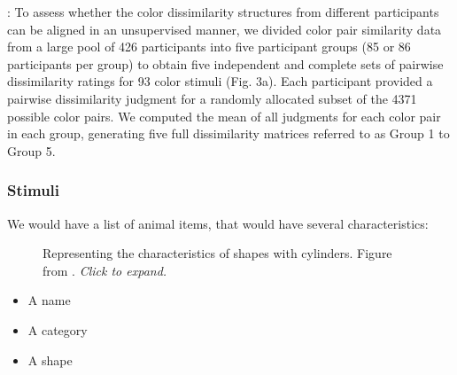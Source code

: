 \documentclass[
  authoryear]{elsarticle}
\begin{document}
\citet{kawakita2023}: To assess whether the color dissimilarity
structures from different participants can be aligned in an unsupervised
manner, we divided color pair similarity data from a large pool of 426
participants into five participant groups (85 or 86 participants per
group) to obtain five independent and complete sets of pairwise
dissimilarity ratings for 93 color stimuli (Fig. 3a). Each participant
provided a pairwise dissimilarity judgment for a randomly allocated
subset of the 4371 possible color pairs. We computed the mean of all
judgments for each color pair in each group, generating five full
dissimilarity matrices referred to as Group 1 to Group 5.

\subsubsection{Stimuli}\label{stimuli}

We would have a list of animal items, that would have several
characteristics:

\begin{figure}


\caption{\label{fig-marr}Representing the characteristics of shapes with
cylinders. Figure from \citet{marr1997}. \emph{Click to expand.}}

\end{figure}%

\begin{itemize}
\item
  A name
\item
  A category
\item
  A shape
\end{itemize}
\end{document}
